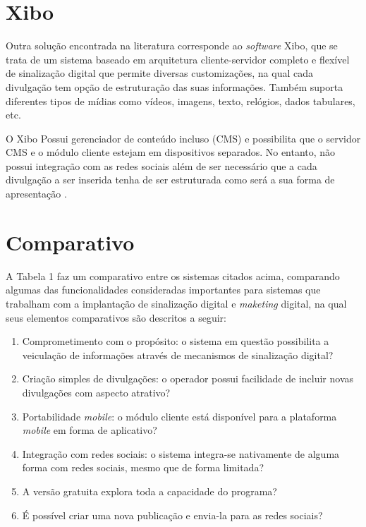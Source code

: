 \section{Xibo}
Outra solução encontrada na literatura corresponde ao \textit{software} Xibo, que se trata de um sistema baseado em arquitetura cliente-servidor completo e flexível de sinalização digital que permite diversas customizações, na qual cada divulgação tem opção de estruturação das suas informações. Também suporta diferentes tipos de mídias como vídeos, imagens, texto, relógios, dados tabulares, etc. 

O Xibo Possui gerenciador de conteúdo incluso (CMS) e possibilita que o servidor CMS e o módulo cliente estejam em dispositivos separados. No entanto, não possui integração com as redes sociais além de ser necessário que a cada divulgação a ser inserida tenha de ser estruturada como será a sua forma de apresentação \cite{xibo2017}.

\section{Comparativo}
A Tabela 1 faz um comparativo entre os sistemas citados acima, comparando algumas das funcionalidades consideradas importantes para sistemas que trabalham com a implantação de sinalização digital e \textit{maketing} digital, na qual seus elementos comparativos são descritos a seguir:
\begin{enumerate}[label=\Roman*)]
	\item Comprometimento com o propósito: o sistema em questão possibilita a veiculação de informações através de mecanismos de sinalização digital?
	\item Criação simples de divulgações: o operador possui facilidade de incluir novas divulgações com aspecto atrativo?
	\item Portabilidade \textit{mobile}: o módulo cliente está disponível para a plataforma \textit{mobile} em forma de aplicativo?
	\item Integração com redes sociais: o sistema integra-se nativamente de alguma forma com redes sociais, mesmo que de forma limitada?
	\item A versão gratuita explora toda a capacidade do programa?
	\item É possível criar uma nova publicação e envia-la para as redes sociais?
\end{enumerate}

